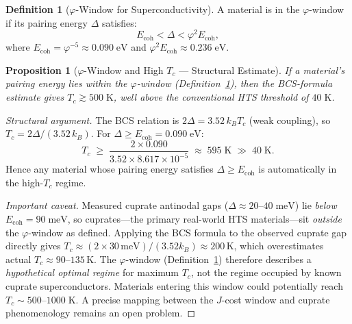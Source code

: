 \documentclass[12pt,a4paper]{article}
\newtheorem{proposition}[theorem]{Proposition}
\theoremstyle{definition}
\newtheorem{definition}[theorem]{Definition}
\theoremstyle{remark}
\begin{document}
\begin{definition}[$\varphi$-Window for Superconductivity]
\label{def:window}
A material is in the $\varphi$-window if its pairing energy
$\Delta$ satisfies:
\begin{equation}
  \boxed{E_{\mathrm{coh}} < \Delta
  < \varphi^2 E_{\mathrm{coh}},}
\end{equation}
where $E_{\mathrm{coh}} = \varphi^{-5} \approx 0.090\;\mathrm{eV}$
and $\varphi^2 E_{\mathrm{coh}} \approx 0.236\;\mathrm{eV}$.
\end{definition}

\begin{proposition}[$\varphi$-Window and High $T_c$ --- Structural Estimate]
\label{thm:window}
If a material's pairing energy lies within the $\varphi$-window
(Definition~\ref{def:window}), then the BCS-formula estimate gives
$T_c \gtrsim 500\;\mathrm{K}$, well above the conventional HTS
threshold of $40\;\mathrm{K}$.
\end{proposition}

\begin{proof}[Structural argument]
The BCS relation is $2\Delta = 3.52\,k_B T_c$ (weak coupling), so
$T_c = 2\Delta/(3.52\,k_B)$.  For $\Delta \geq E_{\mathrm{coh}} =
0.090\;\mathrm{eV}$:
\[
  T_c \;\geq\; \frac{2 \times 0.090}{3.52 \times 8.617 \times 10^{-5}}
  \;\approx\; 595\;\mathrm{K} \;\gg\; 40\;\mathrm{K}.
\]
Hence any material whose pairing energy satisfies $\Delta \geq E_{\mathrm{coh}}$
is automatically in the high-$T_c$ regime.

\smallskip
\noindent\textit{Important caveat.}  Measured cuprate antinodal gaps
($\Delta \approx 20$--$40\;\mathrm{meV}$) lie \emph{below}
$E_{\mathrm{coh}} = 90\;\mathrm{meV}$, so cuprates---the primary
real-world HTS materials---sit \emph{outside} the $\varphi$-window as
defined.  Applying the BCS formula to the observed cuprate gap directly
gives $T_c \approx (2 \times 30\,\mathrm{meV})/(3.52 k_B) \approx 200\,\mathrm{K}$,
which overestimates actual $T_c \approx 90$--$135\,\mathrm{K}$.
The $\varphi$-window (Definition~\ref{def:window}) therefore describes
a \emph{hypothetical optimal regime} for maximum $T_c$, not the regime
occupied by known cuprate superconductors.  Materials entering this
window could potentially reach $T_c \sim 500$--$1000\;\mathrm{K}$.
A precise mapping between the $J$-cost window and cuprate phenomenology
remains an open problem.
\end{proof}

\end{document}

